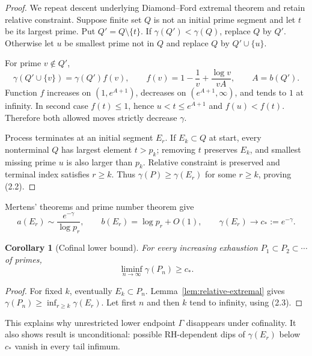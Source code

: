 \documentclass[11pt]{article}
\newtheorem{corollary}[theorem]{Corollary}
\theoremstyle{definition}
\theoremstyle{remark}
\begin{document}
\begin{proof}
We repeat descent underlying Diamond--Ford extremal theorem and retain relative constraint.
Suppose finite set $Q$ is not an initial prime segment and let $t$ be its largest prime.  Put
$Q'=Q\setminus\{t\}$.  If $\gamma(Q')<\gamma(Q)$, replace $Q$ by $Q'$.  Otherwise let $u$ be
smallest prime not in $Q$ and replace $Q$ by $Q'\cup\{u\}$.

For prime $v\notin Q'$,
\[
 \gamma(Q'\cup\{v\})
 =\gamma(Q')f(v),\qquad
 f(v)=1-\frac1v+\frac{\log v}{vA},\qquad A=b(Q').
\]
Function $f$ increases on $(1,e^{A+1})$, decreases on $(e^{A+1},\infty)$, and tends to $1$ at
infinity.  In second case $f(t)\leq1$, hence $u<t\leq e^{A+1}$ and $f(u)<f(t)$.  Therefore both
allowed moves strictly decrease $\gamma$.

Process terminates at an initial segment $E_r$.  If $E_k\subset Q$ at start, every nonterminal
$Q$ has largest element $t>p_k$; removing $t$ preserves $E_k$, and smallest missing prime $u$ is
also larger than $p_k$.  Relative constraint is preserved and terminal index satisfies $r\geq k$.
Thus $\gamma(P)\geq\gamma(E_r)$ for some $r\geq k$, proving (2.2).
\end{proof}

Mertens' theorems and prime number theorem give
\begin{equation}
 a(E_r)\sim\frac{e^{-\gamma}}{\log p_r},\qquad
 b(E_r)=\log p_r+O(1),\qquad
 \gamma(E_r)\longrightarrow c_*:=e^{-\gamma}.             \tag{2.3}
\end{equation}

\begin{corollary}[Cofinal lower bound]
\label{cor:lower}
For every increasing exhaustion $P_1\subset P_2\subset\cdots$ of primes,
\begin{equation}
 \liminf_{n\to\infty}\gamma(P_n)\geq c_*.                \tag{2.4}
\end{equation}
\end{corollary}

\begin{proof}
For fixed $k$, eventually $E_k\subset P_n$.  Lemma~\ref{lem:relative-extremal} gives
$\gamma(P_n)\geq\inf_{r\geq k}\gamma(E_r)$.  Let first $n$ and then $k$ tend to infinity, using
(2.3).
\end{proof}

This explains why unrestricted lower endpoint $\Gamma$ disappears under cofinality.  It also
shows result is unconditional: possible RH-dependent dips of $\gamma(E_r)$ below $c_*$ vanish
in every tail infimum.
\end{document}
